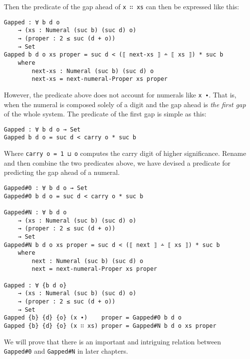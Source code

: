 \documentclass[\main/thesis.tex]{subfiles}
\begin{document}
Then the predicate of the gap ahead of {\lstinline|x ∷ xs|} can then be expressed
like this:

\begin{lstlisting}
Gapped : ∀ b d o
    → (xs : Numeral (suc b) (suc d) o)
    → (proper : 2 ≤ suc (d + o))
    → Set
Gapped b d o xs proper = suc d < (⟦ next-xs ⟧ ∸ ⟦ xs ⟧) * suc b
    where
        next-xs : Numeral (suc b) (suc d) o
        next-xs = next-numeral-Proper xs proper
\end{lstlisting}

However, the predicate above does not account for numerals like {\lstinline|x ∙|}.
That is, when the numeral is composed solely of a digit and the gap ahead is
\textit{the first gap} of the whole system.
The predicate of the first gap is simple as this:

\begin{lstlisting}
Gapped : ∀ b d o → Set
Gapped b d o = suc d < carry o * suc b
\end{lstlisting}

Where {\lstinline|carry o = 1 ⊔ o|} computes the carry digit of higher significance.
Rename and then combine the two predicates above, we have devised a predicate
for predicting the gap ahead of a numeral.

\begin{lstlisting}
Gapped#0 : ∀ b d o → Set
Gapped#0 b d o = suc d < carry o * suc b

Gapped#N : ∀ b d o
    → (xs : Numeral (suc b) (suc d) o)
    → (proper : 2 ≤ suc (d + o))
    → Set
Gapped#N b d o xs proper = suc d < (⟦ next ⟧ ∸ ⟦ xs ⟧) * suc b
    where
        next : Numeral (suc b) (suc d) o
        next = next-numeral-Proper xs proper

Gapped : ∀ {b d o}
    → (xs : Numeral (suc b) (suc d) o)
    → (proper : 2 ≤ suc (d + o))
    → Set
Gapped {b} {d} {o} (x ∙)    proper = Gapped#0 b d o
Gapped {b} {d} {o} (x ∷ xs) proper = Gapped#N b d o xs proper
\end{lstlisting}

We will prove that there is an important and intriguing relation between
{\lstinline|Gapped#0|} and {\lstinline|Gapped#N|} in later chapters.
\end{document}
